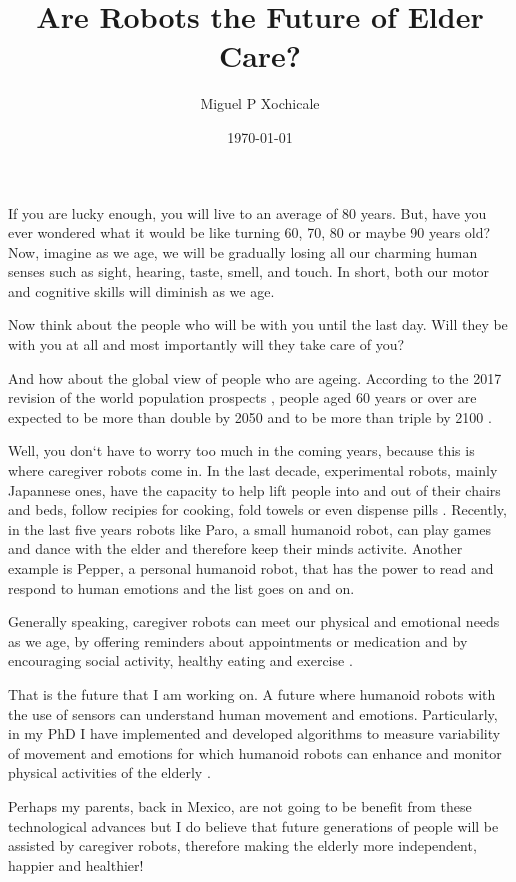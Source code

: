 \documentclass[12pt]{article}
\author{Miguel P Xochicale}
\title{ Are Robots the Future of Elder Care?  }
\date{\today}
\begin{document}
\maketitle

If you are lucky enough, you will live to an average of 80 years.
But, have you ever wondered what it would be like turning 60, 70, 80 or maybe 90 years old?
Now, imagine as we age, we will be gradually losing all our
charming human senses such as sight, hearing, taste, smell, and touch.
In short, both our motor and cognitive skills will diminish as we age.

Now think about the people who will be with you until the last day.
Will they be with you at all 
and most importantly will they take care of you?

And how about the global view of people who are ageing.
According to the 2017 revision of the world population prospects \cite{un2017}, 
people aged 60 years or over
are expected to be more than double by 2050 and to be more than triple by 2100 \cite{unb2017}.

Well, you don`t have to worry too much in the coming years, 
because this is where caregiver robots come in.
In the last decade, experimental robots, mainly Japannese ones, 
have the capacity to help lift people into and out of their chairs and beds,
follow recipies for cooking, fold towels or even dispense pills \cite{matuszek2017}.
Recently, in the last five years robots like
Paro, a small humanoid robot, can play games and dance with the elder
and therefore keep their minds activite.
Another example is Pepper, a personal humanoid robot, that has the power 
to read and respond to human emotions \cite{hay2015}
and the list goes on and on.

Generally speaking, caregiver robots can meet our physical and emotional needs as we age,
by offering reminders about appointments or medication 
and by encouraging social activity, healthy eating and exercise \cite{aronson2014}.

That is the future that I am working on.
A future where humanoid robots with the use of sensors can understand human movement and emotions.
Particularly, in my PhD I have implemented and developed algorithms to measure 
variability of movement and emotions 
for which humanoid robots can enhance and monitor physical activities of the elderly \cite{xochicale2018}.

Perhaps my parents, back in Mexico, are not going to be benefit 
from these technological advances 
but I do believe that future generations of people will be assisted by caregiver robots,
therefore making the elderly more independent, happier and healthier!
\end{document}
